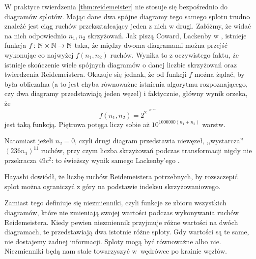 W praktyce twierdzenia \ref{thm:reidemeister} nie stosuje się bezpośrednio do diagramów splotów.
Mając dane dwa spójne diagramy tego samego splotu trudno znaleźć jest ciąg ruchów przekształcający jeden z nich w drugi.
Załóżmy, że widać na nich odpowiednio $n_1, n_2$ skrzyżowań.
Jak piszą Coward, Lackenby w \cite{coward11}, istnieje funkcja $f \colon \mathbb N \times \mathbb N \to \mathbb N$ taka, że między dwoma diagramami można przejść wykonując co najwyżej $f(n_1, n_2)$ ruchów.
%
%
Wynika to z oczywistego faktu, że istnieje skończenie wiele spójnych diagramów o danej liczbie skrzyżowań oraz twierdzenia Reidemeistera.
Okazuje się jednak, że od funkcji $f$ można żądać, by była obliczalna
(a to jest chyba równoważne istnienia algorytmu rozpoznającego, czy dwa diagramy przedstawiają jeden węzeł)
i faktycznie, główny wynik \cite{coward11} orzeka, że
\begin{equation}
    f(n_1, n_2) = 2^{2^{\ldots^{2^{n_1 + n_2}}}}
\end{equation}
jest taką funkcją.
Piętrowa potęga liczy sobie aż $10^{1000000 (n_1 + n_2)}$ warstw.

Natomiast jeżeli $n_2 = 0$, czyli drugi diagram przedstawia niewęzeł, ,,wystarcza'' $(236n_1)^{11}$ ruchów, przy czym liczba skrzyżowań podczas transformacji nigdy nie przekracza $49c^2$: to świeższy wynik samego Lackenby'ego \cite{lackenby15}.

Hayashi \cite{hayashi05} dowiódł, że liczbę ruchów Reidemeistera potrzebnych, by rozszczepić splot można ograniczyć z góry na podstawie indeksu skrzyżowaniowego.
%

Zamiast tego definiuje się niezmienniki, czyli funkcje ze zbioru wszystkich diagramów, które nie zmieniają swojej wartości podczas wykonywania ruchów Reidemeistera.
Kiedy pewien niezmiennik przyjmuje różne wartości na dwóch diagramach, te przedstawiają dwa istotnie różne sploty.
Gdy wartości są te same, nie dostajemy żadnej informacji.
Sploty mogą być równoważne albo nie.
Niezmienniki będą nam stale towarzyszyć w~wędrówce po krainie węzłów.


